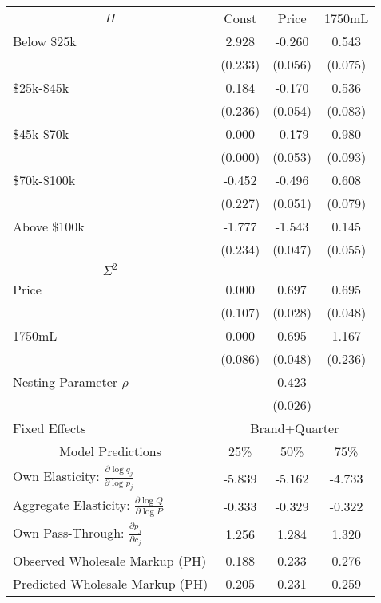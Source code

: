 \begin{tabular}{lccc} 
\toprule 
\multicolumn{1}{c}{$\Pi$} &  Const &  Price &  1750mL \\ 
\cmidrule(r){1-1} \cmidrule(rrr){2-4} 
Below \$25k  &  2.928 & -0.260 &   0.543 \\
            &  (0.233) &  (0.056) &   (0.075) \\
\$25k-\$45k   &  0.184 & -0.170 &   0.536 \\
            &  (0.236) &  (0.054) &   (0.083) \\
\$45k-\$70k   &  0.000 & -0.179 &   0.980 \\
            &  (0.000) &  (0.053) &   (0.093) \\
\$70k-\$100k  & -0.452 & -0.496 &   0.608 \\
            &  (0.227) &  (0.051) &   (0.079) \\
Above \$100k & -1.777 & -1.543 &   0.145 \\
            &  (0.234) &  (0.047) &   (0.055) \\
\midrule \multicolumn{1}{c}{$\Sigma^2$}& \multicolumn{2}{c}{} \\ \cmidrule(r){1-1} \cmidrule(rrr){2-4}
Price       &  0.000 &  0.697 &   0.695 \\
            &  (0.107) &  (0.028) &   (0.048) \\
1750mL      &  0.000 &  0.695 &   1.167 \\
            &  (0.086) &  (0.048) &   (0.236) \\
\midrule  
\multicolumn{1}{l}{Nesting Parameter $\rho$} &  &0.423&    \\ 
& &(0.026)&     \\ 
\multicolumn{1}{l}{Fixed Effects} &   \multicolumn{3}{c}{Brand+Quarter}\\ 
\midrule 
\multicolumn{1}{c}{Model Predictions}& 25\% & 50\% & 75\% \\ \midrule\midrule
Own Elasticity:  $\frac{\partial \log q_j}{\partial \log p_j}$                  & -5.839 & -5.162 & -4.733 \\
Aggregate Elasticity: $\frac{\partial \log Q}{\partial \log P}$            & -0.333 & -0.329 & -0.322 \\
Own Pass-Through: $\frac{\partial p_j}{\partial c_j}$          & 1.256 & 1.284 &  1.320 \\
Observed Wholesale Markup (PH)  &  0.188 &  0.233 &  0.276 \\
Predicted Wholesale Markup (PH) &  0.205 &  0.231 &  0.259 \\
\bottomrule 
\end{tabular}